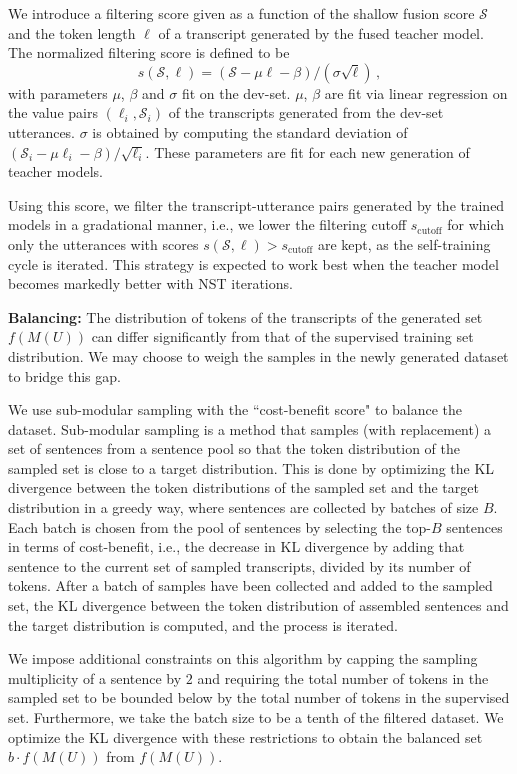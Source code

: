 \documentclass[a4paper]{article}
\newcommand{\be}{\begin{equation}}
\newcommand{\ee}{\end{equation}}
\begin{document}
We introduce a filtering score given as a function of the shallow fusion score $\mathcal{S}$ and the token length $\ell$ of a transcript generated by the fused teacher model. The normalized filtering score is defined to be
\be\label{score}
s(\mathcal{S},\ell) = (\mathcal{S} - \mu \ell  - \beta) / (\sigma \sqrt{\ell}) \,,
\ee
with parameters $\mu$, $\beta$ and $\sigma$ fit on the dev-set. $\mu$, $\beta$ are fit via linear regression on the value pairs $(\ell_i, \mathcal{S}_i)$ of the transcripts generated from the dev-set utterances. $\sigma$ is obtained by computing the standard deviation of $(\mathcal{S}_i - \mu \ell_i -\beta) / \sqrt{\ell_i}$. These parameters are fit for each new generation of teacher models.

Using this score, we filter the transcript-utterance pairs generated by the trained models in a gradational manner, i.e., we lower the filtering cutoff $s_\text{cutoff}$ for which only the utterances with scores $s(\mathcal{S}, \ell) > s_\text{cutoff}$ are kept, as the self-training cycle is iterated. This strategy is expected to work best when the teacher model becomes markedly better with NST iterations.
\smallskip

\noindent\textbf{Balancing: }
The distribution of tokens of the transcripts of the generated set $f(M(U))$ can differ significantly from that of the supervised training set distribution. We may choose to weigh the samples in the newly generated dataset to bridge this gap.

We use sub-modular sampling \cite{shinohara2014} with the ``cost-benefit score" to balance the dataset. Sub-modular sampling is a method that samples (with replacement) a set of sentences from a sentence pool so that the token distribution of the sampled set is close to a target distribution. This is done by optimizing the KL divergence between the token distributions of the sampled set and the target distribution in a greedy way, where sentences are collected by batches of size $B$. Each batch is chosen from the pool of sentences by selecting the top-$B$ sentences in terms of cost-benefit, i.e., the decrease in KL divergence by adding that sentence to the current set of sampled transcripts, divided by its number of tokens. After a batch of samples have been collected and added to the sampled set, the KL divergence between the token distribution of assembled sentences and the target distribution is computed, and the process is iterated.

We impose additional constraints on this algorithm by capping the sampling multiplicity of a sentence by $2$  and requiring the total number of tokens in the sampled set to be bounded below by the total number of tokens in the supervised set. Furthermore, we take the batch size to be a tenth of the filtered dataset. We optimize the KL divergence with these restrictions to obtain the balanced set $b \cdot f (M(U))$ from $f(M(U))$.
\smallskip
\end{document}
